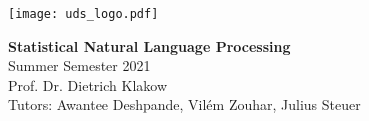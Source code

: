 \begin{minipage}{0.30\textwidth}
    \texttt{[image: uds\_logo.pdf]}
\end{minipage}
\begin{minipage}{0.69\textwidth} 
\vspace{0.2cm}
\begin{flushright}
\Large{\textbf{Statistical Natural Language Processing}} \\
\vspace{0.1cm}
\small{Summer Semester 2021} \\
\small{Prof. Dr. Dietrich Klakow} \\
\small{Tutors: Awantee Deshpande, Vilém Zouhar, Julius Steuer} \\
\end{flushright}
\end{minipage}